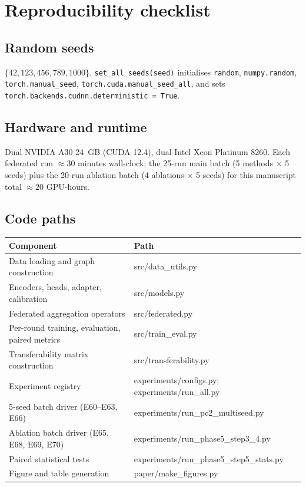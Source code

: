 \documentclass[11pt,a4paper]{article}
\begin{document}
\section{Reproducibility checklist}\label{si:repro}

\subsection{Random seeds}
$\{42, 123, 456, 789, 1000\}$.  \verb|set_all_seeds(seed)| initialises \verb|random|, \verb|numpy.random|, \verb|torch.manual_seed|, \verb|torch.cuda.manual_seed_all|, and sets \verb|torch.backends.cudnn.deterministic = True|.

\subsection{Hardware and runtime}
Dual NVIDIA A30 24~GB (CUDA 12.4), dual Intel Xeon Platinum 8260. Each federated run $\approx 30$ minutes wall-clock; the 25-run main batch (5 methods $\times$ 5 seeds) plus the 20-run ablation batch (4 ablations $\times$ 5 seeds) for this manuscript total $\approx 20$ GPU-hours.

\subsection{Code paths}
\noindent\footnotesize
\begin{tabularx}{\textwidth}{@{}X >{\ttfamily}l@{}}
\toprule
\normalfont Component & \normalfont Path \\
\midrule
Data loading and graph construction            & src/data\_utils.py \\
Encoders, heads, adapter, calibration          & src/models.py \\
Federated aggregation operators                & src/federated.py \\
Per-round training, evaluation, paired metrics & src/train\_eval.py \\
Transferability matrix construction            & src/transferability.py \\
Experiment registry                            & experiments/configs.py; experiments/run\_all.py \\
5-seed batch driver (E60--E63, E66)            & experiments/run\_pc2\_multiseed.py \\
Ablation batch driver (E65, E68, E69, E70)     & experiments/run\_phase5\_step3\_4.py \\
Paired statistical tests                       & experiments/run\_phase5\_step5\_stats.py \\
Figure and table generation                    & paper/make\_figures.py \\
\bottomrule
\end{tabularx}\normalsize
\end{document}
